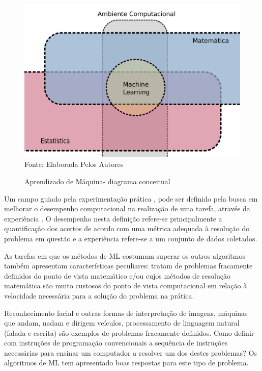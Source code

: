 \begin{figure}[!htb]
	\centering
	\caption{Aprendizado de Máquina- diagrama conceitual}
	\includegraphics[width=.7\textwidth]{../Figures/ML/mat_est_ML.png}
	\\{\footnotesize Fonte: Elaborada Pelos Autores}
	\label{fig:MLdiag}
\end{figure}

Um campo guiado pela experimentação prática \cite{bishop2006}, pode ser definido pela busca em melhorar o desempenho computacional na realização de uma tarefa, através da experiência \cite{mitchell1997}. O desempenho nesta definição refere-se principalmente a quantificação dos acertos de acordo com uma métrica adequada à resolução do problema em questão e a experiência refere-se a um conjunto de dados coletados.

As tarefas em que os métodos de ML costumam superar os outros algoritmos também apresentam características peculiares: tratam de problemas fracamente definidos do ponto de vista matemático e/ou cujos métodos de resolução matemática são muito custosos do ponto de vista computacional em relação à velocidade necessária para a solução do problema na prática.

Reconhecimento facial e outras formas de interpretação de imagens, máquinas que andam, nadam e dirigem veículos, processamento de linguagem natural (falada e escrita) são exemplos de problemas fracamente definidos. Como definir com instruções de programação convencionais a sequência de instruções necessárias para ensinar um computador a resolver um dos destes problemas? Os algoritmos de ML tem apresentado boas respostas para este tipo de problema.

